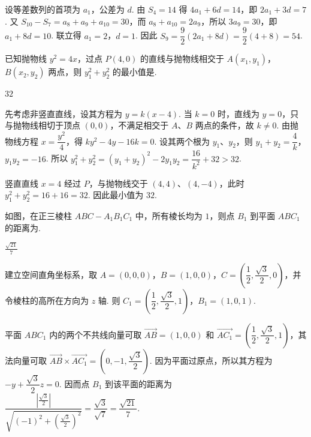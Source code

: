 \begin{solution}
设等差数列的首项为 \(a_1\)，公差为 \(d\). 由 \(S_4=14\) 得 \(4a_1+6d=14\)，即 \(2a_1+3d=7\). 又 \(S_{10}-S_7=a_8+a_9+a_{10}=30\)，而 \(a_8+a_{10}=2a_9\)，所以 \(3a_9=30\)，即 \(a_1+8d=10\). 联立得 \(a_1=2\)，\(d=1\). 因此 \(S_9=\dfrac{9}{2}(2a_1+8d)=\dfrac{9}{2}(4+8)=54\).
\end{solution}

\begin{problem}
已知抛物线 \( y^{2} = 4x \)，过点 \( P(4,0) \) 的直线与抛物线相交于 \( A(x_{1},y_{1}) \)，\( B(x_{2},y_{2}) \) 两点，则 \( y_{1}^{2} + y_{2}^{2} \) 的最小值是\fillinblank{}.
\end{problem}

\begin{answer}
\(32\)
\end{answer}

\begin{solution}
先考虑非竖直直线，设其方程为 \(y=k(x-4)\). 当 \(k=0\) 时，直线为 \(y=0\)，只与抛物线相切于顶点 \((0,0)\)，不满足相交于 \(A\)、\(B\) 两点的条件，故 \(k\neq0\). 由抛物线方程 \(x=\dfrac{y^2}{4}\)，得 \(ky^2-4y-16k=0\). 设其两个根为 \(y_1\)、\(y_2\)，则 \(y_1+y_2=\dfrac4k\)，\(y_1y_2=-16\). 所以 \(y_1^2+y_2^2=(y_1+y_2)^2-2y_1y_2=\dfrac{16}{k^2}+32>32\).

竖直直线 \(x=4\) 经过 \(P\)，与抛物线交于 \((4,4)\)、\((4,-4)\)，此时 \(y_1^2+y_2^2=16+16=32\). 因此最小值为 \(32\).
\end{solution}

\begin{problem}
如图，在正三棱柱 \(ABC - A_{1}B_{1}C_{1}\) 中，所有棱长均为 \(1\)，则点 \(B_{1}\) 到平面 \(ABC_{1}\) 的距离为\fillinblank{}.

\end{problem}

\begin{answer}
\(\frac{\sqrt{21}}{7}\)
\end{answer}

\begin{solution}
建立空间直角坐标系，取 \(A=(0,0,0)\)，\(B=(1,0,0)\)，\(C=\left(\dfrac12,\dfrac{\sqrt3}{2},0\right)\)，并令棱柱的高所在方向为 \(z\) 轴. 则 \(C_1=\left(\dfrac12,\dfrac{\sqrt3}{2},1\right)\)，\(B_1=(1,0,1)\).

平面 \(ABC_1\) 内的两个不共线向量可取 \(\overrightarrow{AB}=(1,0,0)\) 和 \(\overrightarrow{AC_1}=\left(\dfrac12,\dfrac{\sqrt3}{2},1\right)\)，其法向量可取 \(\overrightarrow{AB}\times\overrightarrow{AC_1}=\left(0,-1,\dfrac{\sqrt3}{2}\right)\). 因为平面过原点，所以其方程为 \(-y+\dfrac{\sqrt3}{2}z=0\). 因而点 \(B_1\) 到该平面的距离为 \(\dfrac{\left|\frac{\sqrt3}{2}\right|}{\sqrt{(-1)^2+\left(\frac{\sqrt3}{2}\right)^2}}=\dfrac{\sqrt3}{\sqrt7}=\dfrac{\sqrt{21}}7\).
\end{solution}

